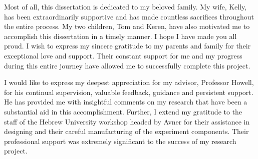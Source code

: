 \documentclass[\main/master.tex]{subfiles}
\begin{document}
Most of all, this dissertation is dedicated to my beloved family. My wife, Kelly, has been extraordinarily supportive and has made countless sacrifices throughout the entire
process. My two children, Tom and Keren, have also motivated me to accomplish this dissertation in a timely manner. I hope I have made you all proud. I wish to express my
sincere gratitude to my parents and family for their exceptional love and support. Their constant support for me and my progress during this entire journey have allowed me
to successfully complete this project. 
\par\noindent
I would like to express my deepest appreciation for my advisor, Professor Howell, for his continual supervision, valuable feedback, guidance and persistent support. He has provided me with insightful comments on my research that have been a substantial aid in this accomplishment. Further, I extend my gratitude to the staff of the Hebrew University workshop headed by Avner for their assistance in designing and their careful manufacturing of the experiment components. Their professional support was extremely significant to the success of my research project.
\par\noindent
\end{document}
